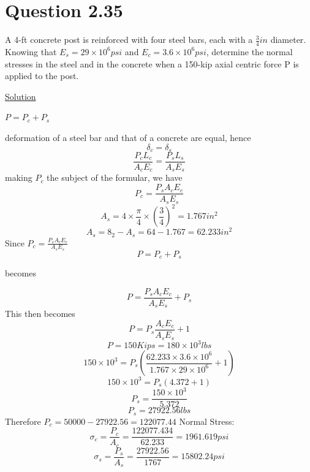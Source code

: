 \documentclass{article}
\begin{document}
\section*{Question 2.35}
A 4-ft concrete post is reinforced with four steel bars, each with a $\frac{3}{4}in$ diameter. Knowing that $E_{s} = 29 \times 10^{6} psi$ and $E_{c}= 3.6 \times 10^{6} psi$, determine the normal stresses in the steel and in the concrete when a 150-kip axial centric force P is applied to the post.
\begin{center}\underline{ Solution}\end{center}
\begin{center}$ P = P_{c} + P_{s}$\end{center}
deformation of a steel bar and that of a concrete are equal, hence
\[\delta_{c} = \delta_{s}\]
\[\frac{P_{c}L_{c}}{A_{c}E_{c}} = \frac{P_{s}L_{s}}{A_{s}E_{s}}\]
making $P_{c}$ the subject of the formular, we have
\[P_{c} = \frac{P_{s}A_{c}E_{c}}{A_{s}E_{s}}\]
\[A_{s} = 4\times\frac{\pi}{4} \times(\frac{3}{4})^{2} = 1.767in^{2}\]
\[A_{s} = 8_{2} - A_{s}= 64 - 1.767 = 62.233in^{2}\]
Since $P_{c} = \frac{P_{s}A_{c}E_{c}}{A_{s}E_{s}}$
\[P = P_{c} + P_{s}\]
\begin{center} becomes\end{center}
\[P = \frac{P_{s}A_{c}E_{c}}{A_{s}E_{s}} + P_{s}\]
This then becomes
\[P = P_{s}\frac{A_{c}E_{c}}{A_{s}E_{s}} + 1\]
\[P = 150Kips = 180 \times 10^{3}lbs\]
\[150\times10^{3} = P_{s}(\frac{62.233\times3.6\times10^{6}}{1.767\times29\times10^{6}} + 1)\]
\[150 \times 10^{3} = P_{s}(4.372 + 1)\]
\[P_{s} = \frac{150\times10^{3}}{5.372}\]
\[P_{s} = 27922.56lbs\]
Therefore $P_{c} = 50000 - 27922.56 = 122077.44$
Normal Stress:
\[\sigma_{c} = \frac{P_{c}}{A_{c}} = \frac{122077.434}{62.233} = 1961.619psi\]
\[\sigma_{s} = \frac{P_{s}}{A_{s}} = \frac{27922.56}{1767} = 15802.24psi\]
\end{document}
